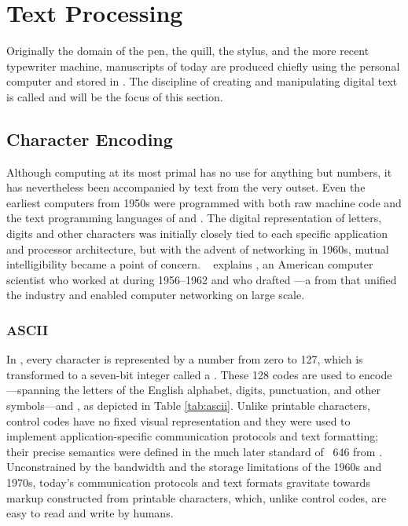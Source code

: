 \section{Text Processing}
Originally the domain of the pen, the quill, the stylus, and the more recent
typewriter machine, manuscripts of today are produced chiefly using the personal
computer and stored in . The discipline of creating and
manipulating digital text is called  and will be the focus
of this section.

\subsection{Character Encoding}
Although computing at its most primal has no use for anything but numbers, it
has nevertheless been accompanied by text from the very outset. Even the
earliest computers from 1950s were programmed with both raw machine code and
the text programming languages of  and . The
digital representation of letters, digits and other characters was initially
closely tied to each specific application and processor architecture, but with
the advent of networking in 1960s, mutual intelligibility became a point of
concern.
\  explains \cite{brandel99}
, an American computer scientist who worked at 
during 1956--1962 and who drafted ---a
 from \citeyear{asa63} that unified the industry and
enabled computer networking on large scale.

\subsubsection{ASCII}
In , every character is represented by a number from zero to 127,
which is transformed to a seven-bit integer called a .
These 128 codes are used to encode ---spanning the
letters of the English alphabet, digits, punctuation, and other symbols---and
, as depicted in Table \ref{tab:ascii}.  Unlike printable
characters, control codes have no fixed visual representation and they were used
to implement application-specific communication protocols and text formatting;
their precise semantics were defined in the much later standard of
~646 from \citeyear{iso72} \cite{iso72}. Unconstrained by the
bandwidth and the storage limitations of the 1960s and 1970s, today's
communication protocols and text formats gravitate towards markup constructed
from printable characters, which, unlike control codes, are easy to read and
write by humans.


